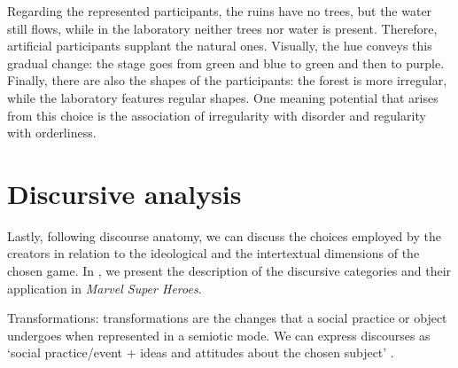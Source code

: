 \documentclass[english]{textolivre}
\begin{document}
Regarding the represented participants, the ruins have no trees, but the water still flows, while in the laboratory neither trees nor water is present. Therefore, artificial participants supplant the natural ones. Visually, the hue conveys this gradual change: the stage goes from green and blue to green and then to purple. Finally, there are also the shapes of the participants: the forest is more irregular, while the laboratory features regular shapes. One meaning potential that arises from this choice is the association of irregularity with disorder and regularity with orderliness.

\section{Discursive analysis}\label{sec-listas}
Lastly, following  discourse anatomy, we can discuss the choices employed by the creators in relation to the ideological and the intertextual dimensions of the chosen game. In , we present the description of the discursive categories and their application in \textit{Marvel Super Heroes}.

Transformations: transformations are the changes that a social practice or object undergoes when represented in a semiotic mode. We can express discourses as ‘social practice/event + ideas and attitudes about the chosen subject’ \cite[p. 94]{van_leeuwen_introducing_2005}.
\end{document}
